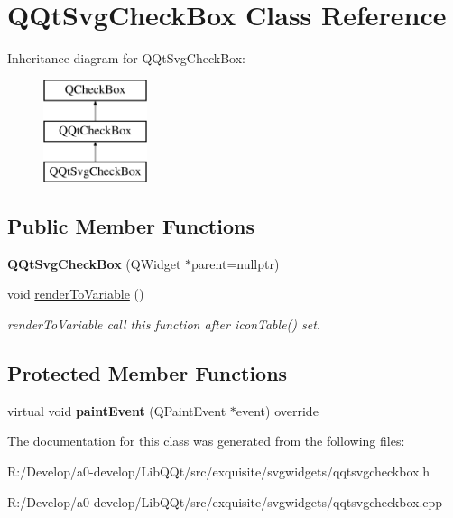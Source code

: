 \hypertarget{class_q_qt_svg_check_box}{}\section{Q\+Qt\+Svg\+Check\+Box Class Reference}
\label{class_q_qt_svg_check_box}
Inheritance diagram for Q\+Qt\+Svg\+Check\+Box\+:\begin{figure}[H]
\begin{center}
\leavevmode
\includegraphics[height=3.000000cm]{class_q_qt_svg_check_box}
\end{center}
\end{figure}
\subsection*{Public Member Functions}
\begin{DoxyCompactItemize}
\item 
\mbox{\label{class_q_qt_svg_check_box_a7f9341c044ccd9cdc471aa07f59ec6a9}} 
{\bfseries Q\+Qt\+Svg\+Check\+Box} (Q\+Widget $\ast$parent=nullptr)
\item 
\mbox{\label{class_q_qt_svg_check_box_a4f1d7b9ab1d9e81624e0b7f74d7fce0d}} 
void \mbox{\hyperlink{class_q_qt_svg_check_box_a4f1d7b9ab1d9e81624e0b7f74d7fce0d}{render\+To\+Variable}} ()
\begin{DoxyCompactList}\small\item\em render\+To\+Variable call this function after icon\+Table() set. \end{DoxyCompactList}\end{DoxyCompactItemize}
\subsection*{Protected Member Functions}
\begin{DoxyCompactItemize}
\item 
\mbox{\label{class_q_qt_svg_check_box_aec51923347299089235f9a753b0e6a7c}} 
virtual void {\bfseries paint\+Event} (Q\+Paint\+Event $\ast$event) override
\end{DoxyCompactItemize}


The documentation for this class was generated from the following files\+:\begin{DoxyCompactItemize}
\item 
R\+:/\+Develop/a0-\/develop/\+Lib\+Q\+Qt/src/exquisite/svgwidgets/qqtsvgcheckbox.\+h\item 
R\+:/\+Develop/a0-\/develop/\+Lib\+Q\+Qt/src/exquisite/svgwidgets/qqtsvgcheckbox.\+cpp\end{DoxyCompactItemize}
